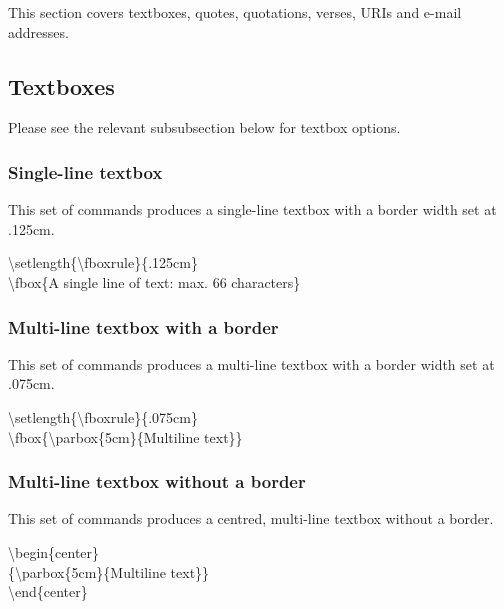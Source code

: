 \documentclass[12pt]{MUNThesisBibTeX}
\begin{document}
This section covers textboxes, quotes, quotations, verses, URIs and e-mail addresses.

\subsection{Textboxes}
Please see the relevant subsubsection below for textbox options.

\subsubsection{Single-line textbox}

This set of commands produces a single-line textbox with a border width set at .125cm.\medskip

\textbackslash setlength\{\textbackslash fboxrule\}\{.125cm\}\\
\textbackslash fbox\{A single line of text: max. 66 characters\}

\medskip

\setlength{\fboxrule}{.125cm}

\subsubsection{Multi-line textbox with a border}

This set of commands produces a multi-line textbox with a border width set at .075cm.\medskip

\textbackslash setlength\{\textbackslash fboxrule\}\{.075cm\}\\
\textbackslash fbox\{\textbackslash parbox\{5cm\}\{Multiline text\}\}

\medskip

\setlength{\fboxrule}{.075cm}

\subsubsection{Multi-line textbox without a border}\label{MultiNoBorder}

This set of commands produces a centred, multi-line textbox without a border.\medskip

\textbackslash begin\{center\}\\
\{\textbackslash parbox\{5cm\}\{Multiline text\}\}\\
\textbackslash end\{center\}
\end{document}
